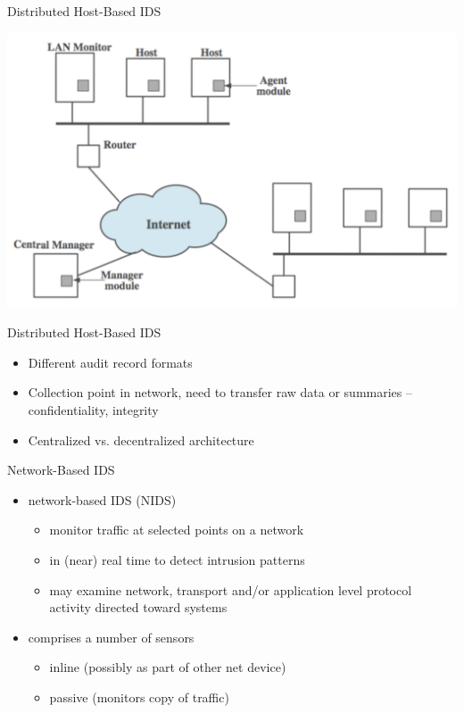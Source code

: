 \documentclass{beamer}
\begin{document}
\begin{frame}{Distributed Host-Based IDS}
  
  \begin{center}
    \includegraphics[width=0.9\linewidth]{distributed-host-ids}
  \end{center}
\end{frame}


\begin{frame}{Distributed Host-Based IDS }
  \begin{itemize}
  \item Different audit record formats 
  \item Collection point in network, need to transfer raw 
    data or summaries – confidentiality, integrity 
  \item Centralized vs. decentralized architecture
  \end{itemize}
\end{frame}

\begin{frame}{Network-Based IDS}
  \begin{itemize}
  \item network-based IDS (NIDS) 
    \begin{itemize}
    \item monitor traffic at selected points on a network 
    \item in (near) real time to detect intrusion patterns 
    \item may examine network, transport and/or application 
      level protocol activity directed toward systems 
    \end{itemize}
  \item comprises a number of sensors 
    \begin{itemize}
    \item inline (possibly as part of other net device) 
    \item passive (monitors copy of traffic)
    \end{itemize}
  \end{itemize}
\end{frame}
\end{document}
